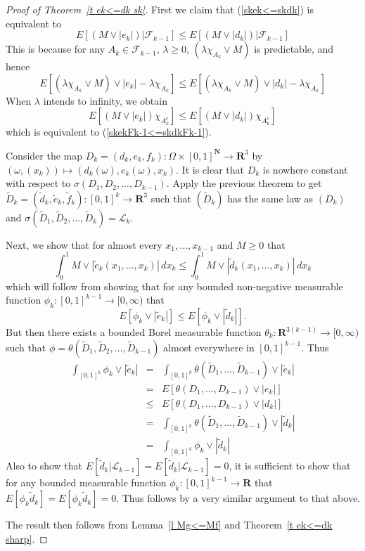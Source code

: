 \documentclass[12pt]{amsart}
\begin{document}
\begin{proof}[Proof of Theorem~\ref{t ek<=dk sk}]
First we claim that (\ref{skek<=skdk}) is equivalent to
\begin{equation}
\label{skekFk-1<=skdkFk-1}
E[(M \vee |e_k|)|\mathcal{F}_{k-1}]\leq E[(M \vee
|d_k|)|\mathcal{F}_{k-1}]
\end{equation}
This is because
for any $A_k \in \mathcal{F}_{k-1}$, $\lambda \geq 0$, $(\lambda
\chi_{A_k} \vee M)$ is predictable, and hence
\[
E[(\lambda \chi_{A_k} \vee M ) \vee |e_k| - \lambda \chi_{A_k}]
\leq 
E[(\lambda \chi_{A_k} \vee M ) \vee |d_k| - \lambda \chi_{A_k}]
\] 
When $\lambda$ intends to infinity, we obtain 
\[E[( M \vee |e_k|)\chi_{A_k^c}]\leq E[(M \vee |d_k|)\chi_{A_k^c}]\] 
which is equivalent to (\ref{skekFk-1<=skdkFk-1}).

Consider the map $D_k=(d_k,e_k,f_k):\Omega \times
[0,1]^\mathbf{N} \rightarrow \mathbf{R}^3$ by
$(\omega,(x_k))\mapsto (d_k(\omega),e_k(\omega),x_k)$. It is clear
that $D_k$ is nowhere constant with respect to
$\sigma(D_1,D_2,...,D_{k-1})$. Apply the previous theorem to get
$\widetilde{D}_k=(\widetilde{d}_k,\widetilde{e}_k,\widetilde{f}_k):[0,1]^k
\rightarrow \mathbf{R}^3 $ such that $(\widetilde{D}_k)$ has the
same law as $(D_k)$ and
$\sigma(\widetilde{D}_1,\widetilde{D}_2,...,\widetilde{D}_k)=\mathcal{L}_k$.

Next, we show that for almost every $x_1, \dots,x_{k-1}$ and $M \ge 0$ that
\[ \int_0^1 M \vee |\widetilde e_k(x_1,\dots,x_k)| \, dx_k
   \le
   \int_0^1 M \vee |\widetilde d_k(x_1,\dots,x_k)| \, dx_k \]
which will follow from showing that for any 
bounded non-negative measurable function
$\phi_k : [0,1]^{k-1} \rightarrow [0,\infty)$ that
\[ E[\phi_k \vee |\widetilde{e}_k|] 
\leq E[\phi_k \vee |\widetilde{d}_k|] .\]
But then there exists a bounded
Borel measurable function $\theta_k : \mathbf{R}^{3(k-1)}
\rightarrow [0,\infty)$ such that
$\phi=\theta(\widetilde{D}_1,\widetilde{D}_2,...,\widetilde{D}_{k-1})$
almost everywhere in $[0,1]^{k-1}$. Thus
\begin{eqnarray*}
\int_{[0,1]^k} \phi_k \vee |\widetilde{e}_k|
&=&\int_{[0,1]^k} \theta(\widetilde{D}_1,...,\widetilde{D}_{k-1})\vee 
   |\widetilde{e}_k| \\
&=& E[ \theta(D_1,...,D_{k-1}) \vee |e_k|] \\
&\le& E[ \theta(D_1,...,D_{k-1}) \vee |d_k|] \\
&=&\int_{[0,1]^k} \theta(\widetilde{D}_1,...,\widetilde{D}_{k-1})\vee 
   |\widetilde{d}_k| \\
&=&
\int_{[0,1]^k} \phi_k \vee |\widetilde{d}_k| 
\end{eqnarray*}
Also to show that 
$E[\widetilde{d}_k|\mathcal{L}_{k-1}]=E[\widetilde{d}_k|\mathcal{L}_{k-1}]=0$,
it is sufficient to show that for any bounded measurable function
$\phi_k : [0,1]^{k-1} \rightarrow \mathbf{R}$
that 
$E[\phi_k \widetilde{d}_k]=E[\phi_k \widetilde{d}_k]=0$.  Thus follows
by a very similar argument to that above.

The result then
follows from Lemma~\ref{l Mg<=Mf} and Theorem~\ref{t ek<=dk sharp}.
\end{proof}
\end{document}
